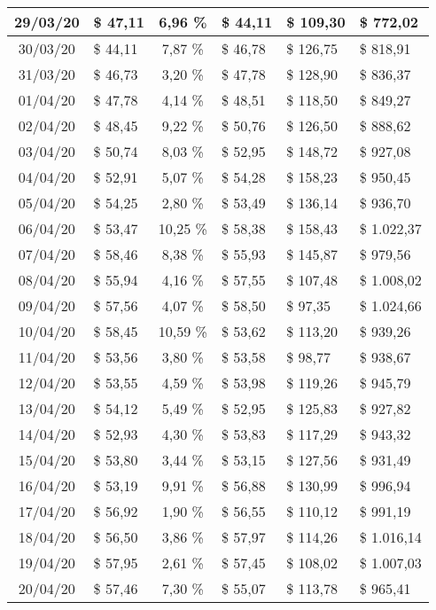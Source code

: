 \begin{center}
\begin{small}
\begin{longtable}{|c|l|c|l|l|l|}
29/03/20 & \$ 47,11 & 6,96 \% & \$ 44,11 & \$ 109,30 & \$ 772,02 \\ \hline
30/03/20 & \$ 44,11 & 7,87 \% & \$ 46,78 & \$ 126,75 & \$ 818,91 \\ \hline
31/03/20 & \$ 46,73 & 3,20 \% & \$ 47,78 & \$ 128,90 & \$ 836,37 \\ \hline
01/04/20 & \$ 47,78 & 4,14 \% & \$ 48,51 & \$ 118,50 & \$ 849,27 \\ \hline
02/04/20 & \$ 48,45 & 9,22 \% & \$ 50,76 & \$ 126,50 & \$ 888,62 \\ \hline
03/04/20 & \$ 50,74 & 8,03 \% & \$ 52,95 & \$ 148,72 & \$ 927,08 \\ \hline
04/04/20 & \$ 52,91 & 5,07 \% & \$ 54,28 & \$ 158,23 & \$ 950,45 \\ \hline
05/04/20 & \$ 54,25 & 2,80 \% & \$ 53,49 & \$ 136,14 & \$ 936,70 \\ \hline
06/04/20 & \$ 53,47 & 10,25 \% & \$ 58,38 & \$ 158,43 & \$ 1.022,37 \\ \hline
07/04/20 & \$ 58,46 & 8,38 \% & \$ 55,93 & \$ 145,87 & \$ 979,56 \\ \hline
08/04/20 & \$ 55,94 & 4,16 \% & \$ 57,55 & \$ 107,48 & \$ 1.008,02 \\ \hline
09/04/20 & \$ 57,56 & 4,07 \% & \$ 58,50 & \$ 97,35 & \$ 1.024,66 \\ \hline
10/04/20 & \$ 58,45 & 10,59 \% & \$ 53,62 & \$ 113,20 & \$ 939,26 \\ \hline
11/04/20 & \$ 53,56 & 3,80 \% & \$ 53,58 & \$ 98,77 & \$ 938,67 \\ \hline
12/04/20 & \$ 53,55 & 4,59 \% & \$ 53,98 & \$ 119,26 & \$ 945,79 \\ \hline
13/04/20 & \$ 54,12 & 5,49 \% & \$ 52,95 & \$ 125,83 & \$ 927,82 \\ \hline
14/04/20 & \$ 52,93 & 4,30 \% & \$ 53,83 & \$ 117,29 & \$ 943,32 \\ \hline
15/04/20 & \$ 53,80 & 3,44 \% & \$ 53,15 & \$ 127,56 & \$ 931,49 \\ \hline
16/04/20 & \$ 53,19 & 9,91 \% & \$ 56,88 & \$ 130,99 & \$ 996,94 \\ \hline
17/04/20 & \$ 56,92 & 1,90 \% & \$ 56,55 & \$ 110,12 & \$ 991,19 \\ \hline
18/04/20 & \$ 56,50 & 3,86 \% & \$ 57,97 & \$ 114,26 & \$ 1.016,14 \\ \hline
19/04/20 & \$ 57,95 & 2,61 \% & \$ 57,45 & \$ 108,02 & \$ 1.007,03 \\ \hline
20/04/20 & \$ 57,46 & 7,30 \% & \$ 55,07 & \$ 113,78 & \$ 965,41 \\ \hline

\end{longtable}
\end{small}
\end{center}
